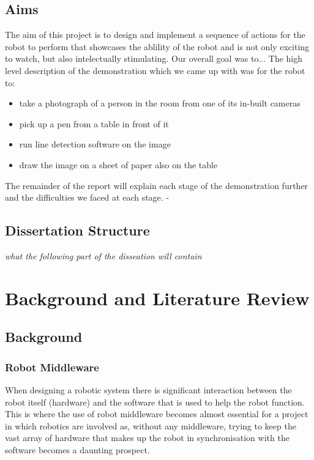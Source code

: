 \documentclass{l3proj}
\begin{document}
\section{Aims}
The aim of this project is to design and implement a sequence of actions for the robot to perform that showcases the ablility of the robot and is not only exciting to watch, but also intelectually stimulating. 
Our overall goal was to...
The high level description of the demonstration which we came up with was for the robot to:
\begin{itemize}
\item take a photograph of a person in the room from one of its in-built cameras
\item pick up a pen from a table in front of it
\item run line detection software on the image
\item draw the image on a sheet of paper also on the table
\end{itemize}
The remainder of the report will explain each stage of the demonstration further and the difficulties we faced at each stage.
-
\section{Dissertation Structure}
\textit{what the following part of the disseation will contain}


%

\chapter{Background and Literature Review}


\section{Background}

\subsection{Robot Middleware}
When designing a robotic system there is significant interaction between the robot itself (hardware) and the software that is used to help the robot function. This is where the use of robot \gls{middleware} becomes almost essential for a project in which robotics are involved as, without any \gls{middleware}, trying to keep the vast array of hardware that makes up the robot in synchronisation with the software becomes a daunting prospect. 
\end{document}
